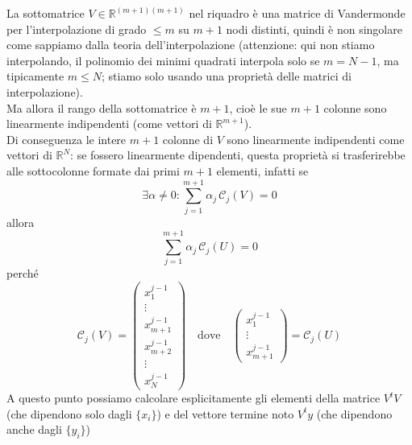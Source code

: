La sottomatrice $V\in\mathbb{R}^{(m+1)(m+1)}$ nel riquadro è una matrice di Vandermonde\\
per l'interpolazione di grado $\leq m$ su $m+1$ nodi distinti, quindi è non singolare come sappiamo dalla teoria dell'interpolazione (attenzione: qui non stiamo interpolando, il polinomio dei minimi quadrati interpola solo se $m=N-1$, ma tipicamente $m\leq N$; stiamo solo usando una proprietà delle matrici di interpolazione).\\Ma allora il rango della sottomatrice è $m+1$, cioè le sue $m+1$ colonne sono linearmente indipendenti (come vettori di $\mathbb{R}^{m+1}$).\\
Di conseguenza le intere $m+1$ colonne di $V$ sono linearmente indipendenti come vettori di $\mathbb{R}^N$: se fossero linearmente dipendenti, questa proprietà si trasferirebbe alle sottocolonne formate dai primi $m+1$ elementi, infatti se
\[\exists \alpha \ne 0: \sum_{j=1}^{m+1} \alpha_j \, \mathcal{C}_j(V) = 0\]
allora
\[\sum_{j=1}^{m+1} \alpha_j \, \mathcal{C}_j(U) = 0\]
perché
\[\mathcal{C}_j(V) = 
\begin{pmatrix}
x_1^{j-1}\\ \vdots \\ x_{m+1}^{j-1} \\ x_{m+2}^{j-1} \\ \vdots \\ x_N^{j-1}
\end{pmatrix}
\quad \text{dove} \quad
\begin{pmatrix}
x_1^{j-1}\\ \vdots \\ x_{m+1}^{j-1}
\end{pmatrix}
= \mathcal{C}_j(U)\]
A questo punto possiamo calcolare esplicitamente gli elementi della matrice $V^t V$ (che dipendono solo dagli $\{x_i\}$) e del vettore termine noto $V^ty$ (che dipendono anche dagli $\{y_i\}$)

